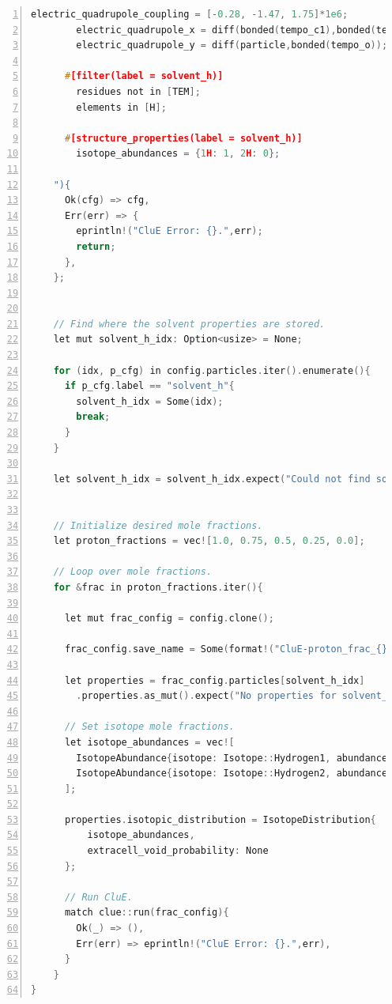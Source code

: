 \documentclass{book}
\begin{document}
\begin{lstlisting}[frame=single,numbers=left,language=c]
        electric_quadrupole_coupling = [-0.28, -1.47, 1.75]*1e6;
        electric_quadrupole_x = diff(bonded(tempo_c1),bonded(tempo_c19));
        electric_quadrupole_y = diff(particle,bonded(tempo_o));

      #[filter(label = solvent_h)]
        residues not in [TEM];
        elements in [H];

      #[structure_properties(label = solvent_h)]
        isotope_abundances = {1H: 1, 2H: 0};

    "){
      Ok(cfg) => cfg,
      Err(err) => {
        eprintln!("CluE Error: {}.",err);
        return;
      },
    };

 
    // Find where the solvent properties are stored.
    let mut solvent_h_idx: Option<usize> = None;

    for (idx, p_cfg) in config.particles.iter().enumerate(){
      if p_cfg.label == "solvent_h"{
        solvent_h_idx = Some(idx);
        break;
      }
    }

    let solvent_h_idx = solvent_h_idx.expect("Could not find solvent_h_idx.");


    // Initialize desired mole fractions.
    let proton_fractions = vec![1.0, 0.75, 0.5, 0.25, 0.0];

    // Loop over mole fractions.
    for &frac in proton_fractions.iter(){
      
      let mut frac_config = config.clone();

      frac_config.save_name = Some(format!("CluE-proton_frac_{}",frac));

      let properties = frac_config.particles[solvent_h_idx]
        .properties.as_mut().expect("No properties for solvent_h");

      // Set isotope mole fractions.
      let isotope_abundances = vec![
        IsotopeAbundance{isotope: Isotope::Hydrogen1, abundance: frac},
        IsotopeAbundance{isotope: Isotope::Hydrogen2, abundance: 1.0 - frac},
      ];

      properties.isotopic_distribution = IsotopeDistribution{
          isotope_abundances,
          extracell_void_probability: None
      };

      // Run CluE.
      match clue::run(frac_config){
        Ok(_) => (),
        Err(err) => eprintln!("CluE Error: {}.",err),
      }
    }
}
\end{lstlisting}
%
\end{document}
